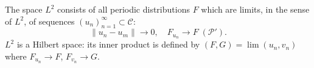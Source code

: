 The space $L^2$ consists of all periodic distributions $F$ which are limits, in the sense of $L^2$, of sequences $(u_n)_{n=1}^{\infty} \subset \mathcal{C}$:
\[
\|u_n - u_m\| \to 0, \quad F_{u_n} \to F \;(\mathcal{P}').
\]
$L^2$ is a Hilbert space: its inner product is defined by $(F, G) = \lim (u_n, v_n)$ where $F_{u_n} \to F$, $F_{v_n} \to G$.
